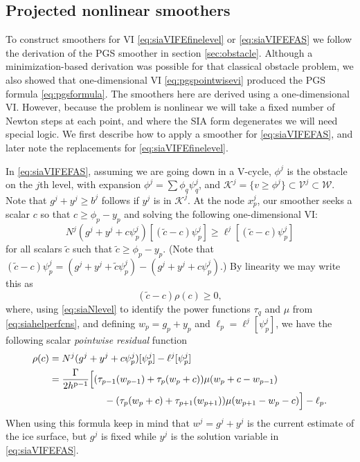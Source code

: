 \documentclass[letterpaper,final,12pt,reqno]{amsart}
\theoremstyle{claim}
\newcommand{\pp}{{\text{p}}}
\numberwithin{equation}{section}
\numberwithin{figure}{section}
\numberwithin{table}{section}
\numberwithin{theorem}{section}
\begin{document}
\subsection{Projected nonlinear smoothers} \label{subsec:pngs}  To construct smoothers for VI \eqref{eq:siaVIFEfinelevel} or \eqref{eq:siaVIFEFAS} we follow the derivation of the PGS smoother in section \ref{sec:obstacle}.  Although a minimization-based derivation was possible for that classical obstacle problem, we also showed that one-dimensional VI \eqref{eq:pgspointwisevi} produced the PGS formula \eqref{eq:pgsformula}.  The smoothers here are derived using a one-dimensional VI.  However, because the problem is nonlinear we will take a fixed number of Newton steps at each point, and where the SIA form degenerates we will need special logic.  We first describe how to apply a smoother for \eqref{eq:siaVIFEFAS}, and later note the replacements for \eqref{eq:siaVIFEfinelevel}.

In \eqref{eq:siaVIFEFAS}, assuming we are going down in a V-cycle, $\phi^j$ is the obstacle on the $j$th level, with expansion $\phi^j = \sum \phi_q \psi_q^j$, and $\mathcal{K}^j = \{v \ge \phi^j\} \subset \mathcal{V}^j \subset \mathcal{W}$.  Note that $g^j+y^j \ge b^j$ follows if $y^j$ is in $\mathcal{K}^j$.  At the node $x_p^j$, our smoother seeks a scalar $c$ so that $c \ge \phi_p - y_p$ and solving the following one-dimensional VI:
\begin{equation}
N^j(g^j+y^j+c\psi_p^j)[(\tilde c - c) \psi_p^j] \ge \ell^j[(\tilde c - c) \psi_p^j] \label{eq:pngspointwiseviEARLY}
\end{equation}
for all scalars $\tilde c$ such that $\tilde c \ge \phi_p - y_p$.
(Note that $(\tilde c - c) \psi_p^j = (g^j+y^j+\tilde c\psi_p^j) - (g^j+y^j+c\psi_p^j)$.)  By linearity we may write this as
\begin{equation}
  (\tilde c - c) \rho(c) \ge 0,  \label{eq:pngspointwisevi}
\end{equation}
where, using \eqref{eq:siaNlevel} to identify the power functions $\tau_q$ and $\mu$ from \eqref{eq:siahelperfcns}, and defining $w_p=g_p+y_p$ and $\ell_p=\ell^j[\psi_p^j]$, we have the following scalar \emph{pointwise residual} function
\begin{align}
  \rho(c) &= N^j(g^j+y^j+c\psi_p^j)[\psi_p^j] - \ell^j[\psi_p^j] \label{eq:pngspointwiseresidual} \\
       &= \frac{\Gamma}{2h^{\pp-1}} \Big[(\tau_{p-1}(w_{p-1}) + \tau_p(w_p +c)) \mu(w_p+c-w_{p-1}) \notag  \\
       &\hspace{20mm} - (\tau_p(w_p+c) + \tau_{p+1}(w_{p+1})) \mu(w_{p+1}-w_p-c)\Big] - \ell_p. \notag
\end{align}
When using this formula keep in mind that $w^j = g^j+y^j$ is the current estimate of the ice surface, but $g^j$ is fixed while $y^j$ is the solution variable in \eqref{eq:siaVIFEFAS}.
\end{document}
